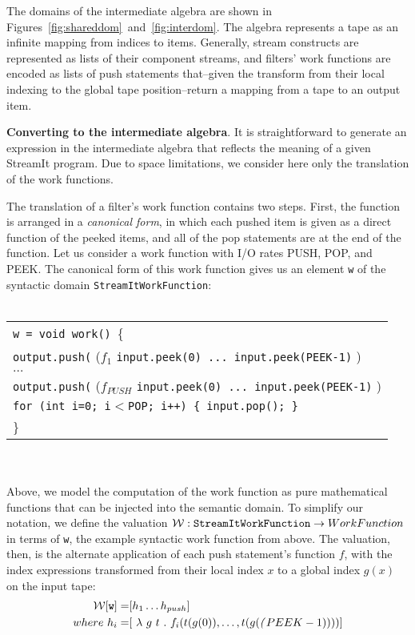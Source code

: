 The domains of the intermediate algebra are shown in
Figures~\ref{fig:shareddom}~and~\ref{fig:interdom}.  The algebra
represents a tape as an infinite mapping from indices to items.
Generally, stream constructs are represented as lists of their
component streams, and filters' work functions are encoded as lists of
push statements that--given the transform from their local indexing to
the global tape position--return a mapping from a tape to an output
item.

{\bf Converting to the intermediate algebra}.  It is straightforward
to generate an expression in the intermediate algebra that reflects
the meaning of a given StreamIt program.  Due to space limitations, we
consider here only the translation of the work functions.

The translation of a filter's work function contains two steps.
First, the function is arranged in a {\it canonical form}, in which
each pushed item is given as a direct function of the peeked items,
and all of the pop statements are at the end of the function.  Let us
consider a work function with I/O rates PUSH, POP, and PEEK.  The
canonical form of this work function gives us an element {\tt w} of
the syntactic domain {\tt StreamItWorkFunction}: \\ \\
\begin{scriptsize}
\begin{tabular}{l}
{\tt w = void work()}~\{ \\
\hspace{12pt} {\tt output.push(} ($f_{1}$ {\tt input.peek(0) ... input.peek(PEEK-1)} ) \\
\hspace{12pt} $\dots$ \\
\hspace{12pt} {\tt output.push(} ($f_{PUSH}$ {\tt input.peek(0) ... input.peek(PEEK-1)} ) \\
\hspace{12pt} {\tt for (int i=0; i$<$POP; i++) \{ input.pop(); \}} \\
\}
\end{tabular}
\end{scriptsize}
\\ \\
Above, we model the computation of the work function as pure
mathematical functions that can be injected into the semantic domain.
To simplify our notation, we define the valuation ${\cal W}: {\tt
StreamItWorkFunction} \ra WorkFunction$ in terms of {\tt w}, the example
syntactic work function from above.  The valuation, then, is the
alternate application of each push statement's function $f$, with the
index expressions transformed from their local index $x$ to a global
index $g(x)$ on the input tape:
\begin{align*}
{\cal W}[{\tt w}] =& [h_1 \dots h_{push}] \\
where~h_i =& [~\la~g~t~.~f_i(t(g(0)), \dots, t(g(\fn(PEEK-1))))]
\end{align*}

